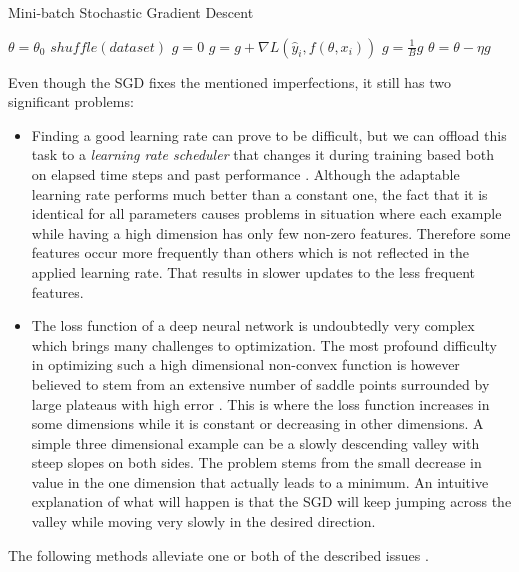 \documentclass[12pt, titlepage]{article}
\begin{document}
\begin{itemize}
\begin{algorithm}
  \label{alg:mini_SGD}
  \caption{Mini-batch Stochastic Gradient Descent}
  \DontPrintSemicolon
  $\theta = \theta_0$\;
  {
  $\mathit{shuffle(dataset)}$\;
  {
  $g = 0$\;
    {
     $g = g + \nabla L(\hat{y}_i,f(\theta, x_i))$\;
    }
  $g = \frac{1}{B} g$\;
  $\theta = \theta - \eta g$
  }
  }
\end{algorithm}
\end{itemize}

Even though the SGD fixes the mentioned imperfections, it still has two significant problems:

\begin{itemize}
\item Finding a good learning rate can prove to be difficult, but we can offload this task to a \textit{learning rate scheduler} that changes it during training based both on elapsed time steps and past performance  \cite{darken1992learning}. Although the adaptable learning rate performs much better than a constant one, the fact that it is identical for all parameters causes problems in situation where each example while having a high dimension has only few non-zero features. Therefore some features occur more frequently than others which is not reflected in the applied learning rate. That results in slower updates to the less frequent features.

\item The loss function of a deep neural network is undoubtedly very complex which brings many challenges to optimization. The most profound difficulty in optimizing such a high dimensional non-convex function is however believed to stem from an extensive number of saddle points surrounded by large plateaus with high error \cite{dauphin2014identifying}. This is where the loss function increases in some dimensions while it is constant or decreasing in other dimensions. A simple three dimensional example can be a slowly descending valley with steep slopes on both sides. The problem stems from the small decrease in value in the one dimension that actually leads to a minimum. An intuitive explanation of what will happen is that the SGD will keep jumping across the valley while moving very slowly in the desired direction.
\end{itemize} 

The following methods alleviate one or both of the described issues \cite{ruder2016overview}.
\end{document}
